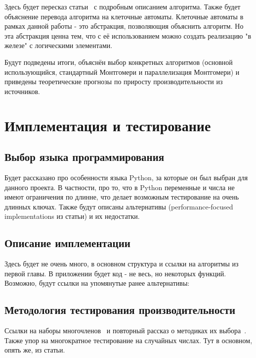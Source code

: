 \documentclass[times,specification,annotation]{itmo-student-thesis}
\begin{document}
Здесь будет пересказ статьи~\cite{ku04} с подробным описанием алгоритма.
Также будет объяснение перевода алгоритма на клеточные автоматы.
Клеточные автоматы в рамках данной работы - это абстракция, позволяющия объяснить алгоритм.
Но эта абстракция ценна тем, что с её использованием можно создать реализацию "в железе" с логическими элементами.

\finishrelatedwork
\chapterconclusion

Будут подведены итоги, объяснён выбор конкретных алгоритмов (основной использующийся, стандартный
Монтгомери и параллелизация Монтгомери) и приведены теоретические прогнозы по приросту производительности
из источников.

\chapter{Имплементация и тестирование}

\section{Выбор языка программирования}\label{sec:prog}

Будет рассказано про особенности языка Python, за которые он был выбран для данного проекта.
В частности, про то, что в Python переменные и числа не имеют ограничения по длинне, что делает
возможным тестирование на очень длинных ключах.
Также будут описаны альтернативы (performance-focused implementations из статьи) и их недостатки.

\section{Описание имплементации}\label{sec:impl}

Здесь будет не очень много, в основном структура и ссылки на алгоритмы из первой главы.
В приложении будет код - не весь, но некоторых функций.
Возможно, будут ссылки на упомянутые ранее альтернативы:~\cite{pri16, mau15}

\section{Методология тестирования производительности}\label{sec:meth}

Ссылки на наборы многочленов~\cite{rfc7296, rfc3526} и повторный рассказ о методиках их выбора~\cite{rfc2412}.
Также упор на многократное тестирование на случайных числах.
Тут в основном, опять же, из статьи.
\end{document}
